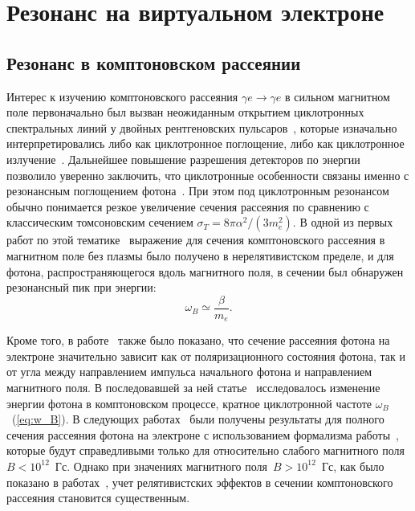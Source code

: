 \section{Резонанс на виртуальном электроне}
\subsection{Резонанс в комптоновском рассеянии}
Интерес к изучению комптоновского рассеяния $\gamma e \to \gamma e$ в 
сильном магнитном поле первоначально был вызван неожиданным открытием циклотронных 
спектральных линий у двойных рентгеновских 
пульсаров~\cite{Truemper1978,Makishima1990,Grove1995}, которые изначально 
интерпретировались либо как циклотронное поглощение, либо как циклотронное 
излучение~\cite{Truemper1978}. Дальнейшее повышение разрешения детекторов по 
энергии позволило уверенно заключить, что циклотронные особенности связаны 
именно с резонансным поглощением фотона~\cite{Mihara:1990}.
При этом под циклотронным резонансом обычно понимается 
резкое увеличение сечения рассеяния по сравнению с классическим томсоновским 
сечением $\sigma_T = 8 \pi \alpha^2 /(3 m_e^2)$. В одной из первых 
работ по этой тематике~\cite{Canuto:1971} выражение для сечения 
комптоновского 
рассеяния в магнитном поле без плазмы было получено
в нерелятивистском пределе, и для фотона, 
распространяющегося вдоль магнитного поля, в сечении был обнаружен резонансный 
пик при энергии:
\begin{equation}\label{eq:w_B}
	\omega_B\simeq \frac{\beta}{m_e}.
\end{equation}
 
Кроме того, в работе~\cite{Canuto:1971} также было показано, что сечение рассеяния фотона 
на электроне
значительно зависит как от поляризационного состояния фотона, так и от угла 
между направлением импульса начального фотона и направлением магнитного поля. В 
последовавшей за ней 
статье~\cite{Gnedin1973} 
исследовалось изменение энергии фотона в комптоновском процессе, кратное 
циклотронной частоте $\omega_B$~(\ref{eq:w_B}). 
В следующих работах~\cite{Borner1979,Ventura:1979} 
были получены результаты для полного сечения рассеяния фотона на электроне с использованием формализма работы~\cite{Canuto:1971}, которые будут справедливыми только для относительно слабого магнитного поля~$B<10^{12}$~Гс. Однако при значениях магнитного поля~$B>10^{12}$~Гс, как было показано в работах~\cite{Herold:1979,Melrose:1983III},   учет релятивистских эффектов в сечении комптоновского рассеяния становится 
существенным.

